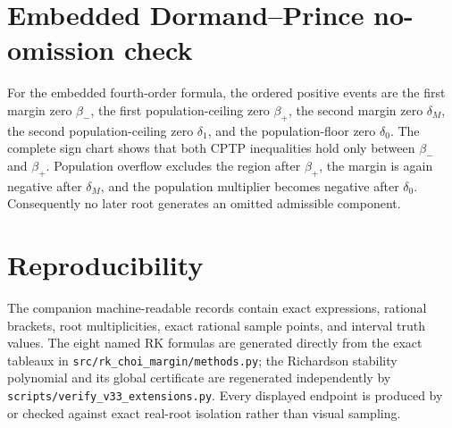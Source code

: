 \section{Embedded Dormand--Prince no-omission check}
For the embedded fourth-order formula, the ordered positive events are the first margin zero $\beta_-$, the first population-ceiling zero $\beta_+$, the second margin zero $\delta_M$, the second population-ceiling zero $\delta_1$, and the population-floor zero $\delta_0$. The complete sign chart shows that both CPTP inequalities hold only between $\beta_-$ and $\beta_+$. Population overflow excludes the region after $\beta_+$, the margin is again negative after $\delta_M$, and the population multiplier becomes negative after $\delta_0$. Consequently no later root generates an omitted admissible component.
\section{Reproducibility}
The companion machine-readable records contain exact expressions, rational brackets, root multiplicities, exact rational sample points, and interval truth values. The eight named RK formulas are generated directly from the exact tableaux in \texttt{src/rk\_choi\_margin/methods.py}; the Richardson stability polynomial and its global certificate are regenerated independently by \texttt{scripts/verify\_v33\_extensions.py}. Every displayed endpoint is produced by or checked against exact real-root isolation rather than visual sampling.
